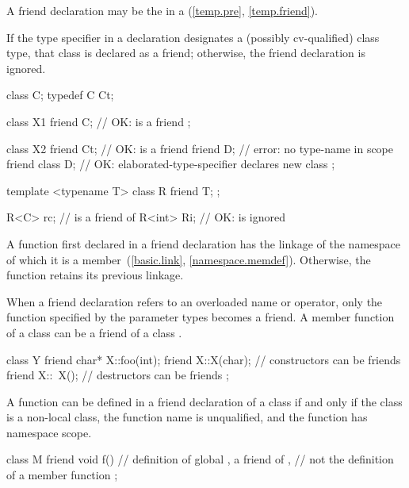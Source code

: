 \begin{note}
A friend declaration may be the
 in a 
(\ref{temp.pre}, \ref{temp.friend}).
\end{note}
If the
type specifier in a  declaration designates a (possibly
cv-qualified) class type, that class is declared as a friend; otherwise, the
friend declaration is ignored.
\begin{example}
\begin{codeblock}
class C;
typedef C Ct;

class X1 {
  friend C;                     // OK:  is a friend
};

class X2 {
  friend Ct;                    // OK:  is a friend
  friend D;                     // error: no type-name  in scope
  friend class D;               // OK: elaborated-type-specifier declares new class
};

template <typename T> class R {
  friend T;
};

R<C> rc;                        //  is a friend of 
R<int> Ri;                      // OK:  is ignored
\end{codeblock}
\end{example}

\pnum
{}%
A function first declared in a friend declaration
has the linkage of the namespace of which it is a member~(\ref{basic.link},
\ref{namespace.memdef}).
Otherwise, the function retains its previous linkage.

\pnum
{}%
When a friend
declaration refers to an overloaded name or operator, only the function specified
by the parameter types becomes a friend.
A member function of a class
can be a friend of
a class
.
%
\begin{example}
\begin{codeblock}
class Y {
  friend char* X::foo(int);
  friend X::X(char);            // constructors can be friends
  friend X::~X();               // destructors can be friends
};
\end{codeblock}
\end{example}

\pnum
{}%
A function can be defined in a friend declaration of a class if and only if the
class is a non-local class, the function name is unqualified,
and the function has namespace scope.
\begin{example}
\begin{codeblock}
class M {
  friend void f() { }           // definition of global , a friend of ,
                                // not the definition of a member function
};
\end{codeblock}
\end{example}

